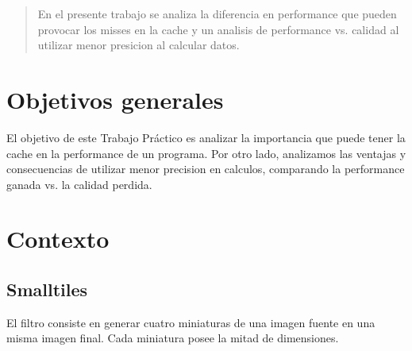 \documentclass[a4paper]{article}
\begin{document}
\thispagestyle{empty}

\maketitle
\newpage

\thispagestyle{empty}
\vfill
\begin{abstract}
En el presente trabajo se analiza la diferencia en performance que pueden provocar los misses en la cache y un analisis de performance vs. calidad al utilizar menor presicion al calcular datos.
\end{abstract}

\thispagestyle{empty}
\vspace{3cm}
\tableofcontents
\newpage


\newpage

\section{Objetivos generales}

El objetivo de este Trabajo Práctico es analizar la importancia que puede tener la cache en la performance de un programa. Por otro lado, analizamos las ventajas y consecuencias de utilizar menor precision en calculos, comparando la performance ganada vs. la calidad perdida.

\section{Contexto}

\subsection{Smalltiles}
El filtro consiste en generar cuatro miniaturas de una imagen fuente en una misma imagen final. Cada miniatura posee la mitad de dimensiones.
\end{document}

